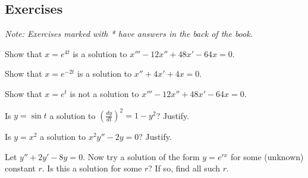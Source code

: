 %



\subsection{Exercises}

\noindent
\emph{Note: Exercises marked with * have answers in the
back of the book.}


\begin{exercise}
Show that $x = e^{4t}$ is a solution to $x'''-12 x'' + 48 x' - 64 x = 0$.
\end{exercise}

\begin{exercise}\ansMark%
Show that $x = e^{-2t}$ is a solution to $x'' + 4x' + 4x = 0$.
\end{exercise}

\begin{exercise}
Show that $x = e^{t}$ is not a solution to $x'''-12 x'' + 48 x' - 64 x = 0$.
\end{exercise}

\begin{exercise}
Is $y = \sin t$ a solution to ${\left( \frac{dy}{dt} \right)}^2 = 1 - y^2$?
Justify.
\end{exercise}

\begin{exercise}\ansMark%
Is $y = x^2$ a solution to $x^2y'' - 2y = 0$?  Justify.
\end{exercise}

\begin{exercise}
Let $y'' + 2y' - 8y = 0$.  Now try a solution of the form $y = e^{rx}$ for
some (unknown) constant $r$.  Is this a solution
for some $r$?  If so, find all such $r$.
\end{exercise}

